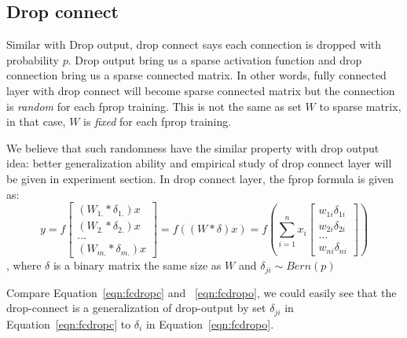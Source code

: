 \documentclass[9pt]{article}
\begin{document}
\subsection{Drop connect}
Similar with Drop output, drop connect says each connection is dropped with
probability $p$. Drop output bring us a sparse activation function and drop
connection bring us a sparse connected matrix. In other words, fully connected layer
with drop connect will become sparse connected matrix but the connection is
{\it random} for each fprop training. 
This is not the same as set $W$ to sparse matrix, 
in that case, $W$ is {\it fixed} for each fprop training. 

We believe that such
randomness have the similar property with drop output idea: better 
generalization ability and empirical study of drop connect layer will be given
in experiment section.
In drop connect layer, the fprop formula is given as:
\begin{equation}
   \label{eqn:fcdropc}
   y = f\begin{bmatrix}
      (W_{1.}*\delta_{1.})x \\
      (W_{2.}*\delta_{2.})x \\
      \ldots \\
      (W_{m.}*\delta_{m.})x 
   \end{bmatrix}
   = f\left(\left(W*\delta\right)x\right) = 
   f\left(
   \sum_{i=1}^n x_i 
   \begin{bmatrix}
      w_{1i}\delta_{1i} \\ 
      w_{2i}\delta_{2i} \\ 
      \ldots \\ 
      w_{ni}\delta_{ni}
    \end{bmatrix}
    \right)
\end{equation}
, where $\delta$ is a binary matrix the same size as $W$ and 
$\delta_{ji}\sim Bern(p)$

Compare Equation~\ref{eqn:fcdropc} and ~\ref{eqn:fcdropo}, we could easily see that
the drop-connect is a generalization of drop-output by set $\delta_{ji}$ in 
Equation~\ref{eqn:fcdropc} to $\delta_i$ in Equation~\ref{eqn:fcdropo}.
\end{document}
